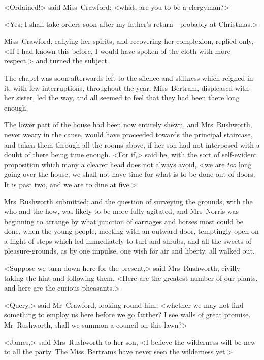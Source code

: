 <Ordained!> said Miss~Crawford; <what, are you to be a clergyman?>

<Yes; I shall take orders soon after my father's return—probably at Christmas.>

Miss~Crawford, rallying her spirits, and recovering her complexion, replied only, <If I had known this before, I would have spoken of the cloth with more respect,> and turned the subject.

The chapel was soon afterwards left to the silence and stillness which reigned in it, with few interruptions, throughout the year. Miss~Bertram, displeased with her sister, led the way, and all seemed to feel that they had been there long enough.

The lower part of the house had been now entirely shewn, and Mrs~Rushworth, never weary in the cause, would have proceeded towards the principal staircase, and taken them through all the rooms above, if her son had not interposed with a doubt of there being time enough. <For if,> said he, with the sort of self-evident proposition which many a clearer head does not always avoid, <we are \textit{too}  long going over the house, we shall not have time for what is to be done out of doors. It is past two, and we are to dine at five.>

Mrs~Rushworth submitted; and the question of surveying the grounds, with the who and the how, was likely to be more fully agitated, and Mrs~Norris was beginning to arrange by what junction of carriages and horses most could be done, when the young people, meeting with an outward door, temptingly open on a flight of steps which led immediately to turf and shrubs, and all the sweets of pleasure-grounds, as by one impulse, one wish for air and liberty, all walked out.

<Suppose we turn down here for the present,> said Mrs~Rushworth, civilly taking the hint and following them. <Here are the greatest number of our plants, and here are the curious pheasants.>

<Query,> said Mr~Crawford, looking round him, <whether we may not find something to employ us here before we go farther? I see walls of great promise. Mr~Rushworth, shall we summon a council on this lawn?>

<James,> said Mrs~Rushworth to her son, <I believe the wilderness will be new to all the party. The Miss~Bertrams have never seen the wilderness yet.>

